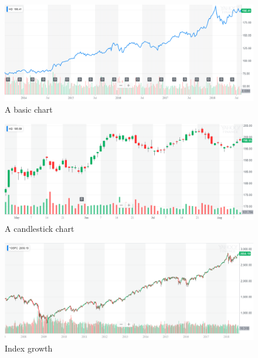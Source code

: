 \documentclass{article}
\begin{document}
\vspace{10pt}

\begin{figure}[!htb]
    \centering
    \includegraphics[width=\textwidth]{imgs/6.png}
    \caption{A basic chart}
\end{figure}

\vspace{10pt}

\begin{figure}[!htb]
    \centering
    \includegraphics[width=\textwidth]{imgs/7.png}
    \caption{A candlestick chart}
\end{figure}

\vspace{10pt}

\begin{figure}[!htb]
    \centering
    \includegraphics[width=\textwidth]{imgs/8.png}
    \caption{Index growth}
\end{figure}
\end{document}
